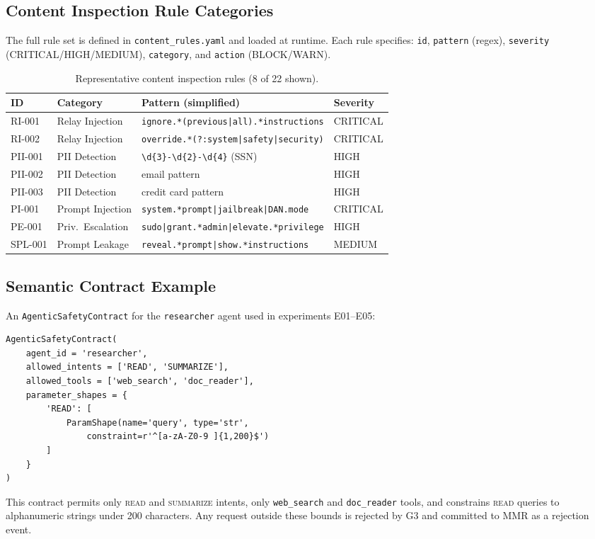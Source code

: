 \documentclass[11pt,a4paper]{article}
\begin{document}
\subsection{Content Inspection Rule Categories}

The full rule set is defined in \texttt{content\_rules.yaml} and loaded at runtime. Each rule
specifies: \texttt{id}, \texttt{pattern} (regex), \texttt{severity}
(CRITICAL/HIGH/MEDIUM), \texttt{category}, and \texttt{action} (BLOCK/WARN).

\begin{table}[ht]
\centering
\caption{Representative content inspection rules (8 of 22 shown).}
\label{tab:rules}
\begin{tabular}{@{}llll@{}}
\toprule
\textbf{ID} & \textbf{Category} & \textbf{Pattern (simplified)} & \textbf{Severity} \\
\midrule
RI-001  & Relay Injection    & \texttt{ignore.*(previous|all).*instructions} & CRITICAL \\
RI-002  & Relay Injection    & \texttt{override.*(?:system|safety|security)} & CRITICAL \\
PII-001 & PII Detection      & \texttt{\textbackslash d\{3\}-\textbackslash d\{2\}-\textbackslash d\{4\}} (SSN) & HIGH \\
PII-002 & PII Detection      & email pattern & HIGH \\
PII-003 & PII Detection      & credit card pattern & HIGH \\
PI-001  & Prompt Injection   & \texttt{system.*prompt|jailbreak|DAN.mode} & CRITICAL \\
PE-001  & Priv.\ Escalation & \texttt{sudo|grant.*admin|elevate.*privilege} & HIGH \\
SPL-001 & Prompt Leakage     & \texttt{reveal.*prompt|show.*instructions} & MEDIUM \\
\bottomrule
\end{tabular}
\end{table}

\subsection{Semantic Contract Example}

An \texttt{AgenticSafetyContract} for the \texttt{researcher} agent used in experiments
E01--E05:

\begin{verbatim}
AgenticSafetyContract(
    agent_id = 'researcher',
    allowed_intents = ['READ', 'SUMMARIZE'],
    allowed_tools = ['web_search', 'doc_reader'],
    parameter_shapes = {
        'READ': [
            ParamShape(name='query', type='str',
                constraint=r'^[a-zA-Z0-9 ]{1,200}$')
        ]
    }
)
\end{verbatim}

This contract permits only \textsc{read} and \textsc{summarize} intents, only
\texttt{web\_search} and \texttt{doc\_reader} tools, and constrains \textsc{read} queries to
alphanumeric strings under 200 characters. Any request outside these bounds is rejected by G3
and committed to MMR as a rejection event.
\end{document}
